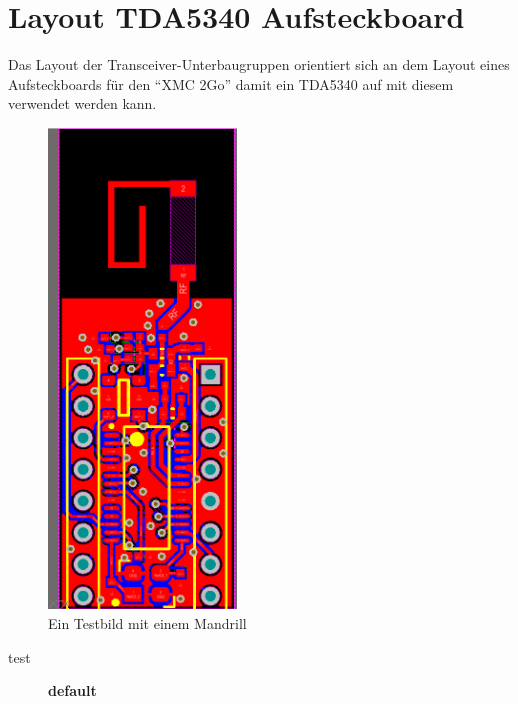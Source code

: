 \section{Layout TDA5340 Aufsteckboard}
Das Layout der Transceiver-Unterbaugruppen orientiert sich an dem Layout eines Aufsteckboards für den \enquote{XMC 2Go} damit ein TDA5340 auf mit diesem verwendet werden kann. 
\begin{figure}[tb]
\centering \includegraphics[width=5cm]{Abbildungen/Aufnahmen/Bilder/Altium/Layout Stefan Erhard/PCB Antenne.png} \caption{Ein Testbild mit einem Mandrill} \label{fig:testbild}
\end{figure}

test
\begin{figure}[htbp]
\begin{center}
\caption{{\bf default}}
\label{default}
\end{center}
\end{figure}



